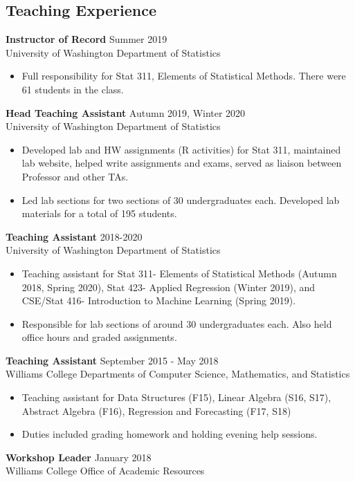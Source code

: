 \documentclass[margin, 10pt]{res} %
\begin{document}
\begin{resume}
{\section{Teaching Experience}
{\textbf{Instructor of Record}} \hfill Summer 2019 \\
University of Washington Department of Statistics
\begin{itemize}
\item Full responsibility for Stat 311, Elements of Statistical Methods. There were 61 students in the class. 
\end{itemize}
{\textbf{Head Teaching Assistant}} \hfill Autumn 2019, Winter 2020 \\
University of Washington Department of Statistics
\begin{itemize}
\item Developed lab and HW assignments (R activities) for Stat 311, maintained lab website, helped write assignments and exams, served as liaison between Professor and other TAs.  
\item Led lab sections for two sections of 30 undergraduates each. Developed lab materials for a total of 195 students. 
\end{itemize} 
{\textbf{Teaching Assistant}} \hfill 2018-2020\\
University of Washington Department of Statistics
\begin{itemize}
\item Teaching assistant for Stat 311- Elements of Statistical Methods (Autumn 2018, Spring 2020), Stat 423- Applied Regression (Winter 2019), 
and CSE/Stat 416- Introduction to Machine Learning (Spring 2019). 
\item Responsible for lab sections of around 30 undergraduates each. Also held office hours and graded assignments.
\end{itemize}
{\textbf{Teaching Assistant}} \hfill September 2015 - May 2018 \\
Williams College Departments of Computer Science, Mathematics, and Statistics
\begin{itemize}
\item Teaching assistant for Data Structures (F15), Linear Algebra (S16, S17), Abstract Algebra (F16), Regression and Forecasting (F17, S18)
\item Duties included grading homework and holding evening help sessions. 
\end{itemize}
{\textbf{Workshop Leader}} \hfill January 2018 \\
Williams College Office of Academic Resources
}
\end{resume}
\end{document}

